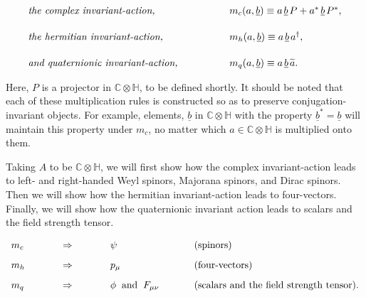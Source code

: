 \documentclass[letterpaper,12pt,titlepage,oneside,final]{book}
\newcommand{\CH}{\mathbb{C}\otimes\mathbb{H}}
\begin{document}
\begin{equation}
\begin{array}{lcl}
\textup{\it the complex invariant-action, \rm}  &\hspace{1cm}& m_c ( a, \underline{b} ) \equiv a\hspace{0.5mm}\underline{b}\hspace{0.5mm}P + a^*\hspace{0.5mm}\underline{b}\hspace{0.5mm}P^*,  \vspace{.5cm}\\
\textup{\it the hermitian invariant-action, \rm} & &m_h ( a,\underline{b} ) \equiv a\hspace{0.5mm}\underline{b}\hspace{0.5mm}a^{\dagger}, \vspace{.5cm} \\
\textup{\it and quaternionic invariant-action, \rm } & & m_q ( a,\underline{b} ) \equiv a\hspace{0.5mm}\underline{b}\hspace{0.5mm}\widetilde{a}.
\end{array}
\end{equation}

\noindent  Here, $P$ is a projector in $\CH$, to be defined shortly.  It should be noted that each of these multiplication rules is constructed so as to preserve conjugation-invariant objects.  For example, elements, $\underline{b}$ in $\CH$ with the property $\underline{b}^* = \underline{b}$ will maintain this property under $m_c$, no matter which $a\in\CH$ is multiplied onto them.



Taking $A$ to be $\CH$, we will first show how the complex invariant-action leads to left- and right-handed Weyl spinors, Majorana spinors, and Dirac spinors.  Then we will show how the hermitian invariant-action leads to four-vectors.  Finally, we will show how the quaternionic invariant  action leads to scalars and the field strength tensor.

$$\begin{array}{lcll}
m_c  &\hspace{1cm}\Rightarrow \hspace{1cm}& \psi &\hspace{9mm}(\textup{spinors})\vspace{.3cm}\\
m_h & \hspace{1cm}\Rightarrow \hspace{1cm}& p_{\mu}&\hspace{9mm}(\textup{four-vectors}) \vspace{.3cm} \\
m_q &\hspace{1cm}\Rightarrow \hspace{1cm} & \phi \hspace{2mm}\textup{and}\hspace{2mm} F_{\mu\nu}  &\hspace{9mm} (\textup{scalars and the field strength tensor}).\vspace{.3cm}
\end{array}$$
\end{document}
